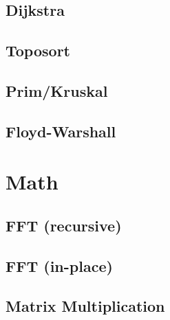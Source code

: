 \subsection{Dijkstra}
\raggedbottom
\vspace{-.7\baselineskip}\hrulefill
\vspace{0.1\baselineskip}\subsection{Toposort}
\raggedbottom
\vspace{-.7\baselineskip}\hrulefill
\vspace{0.1\baselineskip}\subsection{Prim/Kruskal}
\raggedbottom
\vspace{-.7\baselineskip}\hrulefill
\vspace{0.1\baselineskip}\subsection{Floyd-Warshall}
\raggedbottom
\vspace{-.7\baselineskip}\hrulefill
\vspace{0.1\baselineskip}
\section{Math}
\subsection{FFT (recursive)}
\raggedbottom
\vspace{-.7\baselineskip}\hrulefill
\vspace{0.1\baselineskip}\subsection{FFT (in-place)}
\raggedbottom
\vspace{-.7\baselineskip}\hrulefill
\vspace{0.1\baselineskip}\subsection{Matrix Multiplication}
\raggedbottom
\vspace{-.7\baselineskip}\hrulefill
\vspace{0.1\baselineskip}
